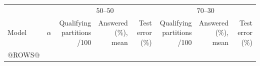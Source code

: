 \begin{tabular}{llrrrrrr}
\toprule
 & & \multicolumn{3}{c}{$50$--$50$} & \multicolumn{3}{c}{$70$--$30$}\\
\cmidrule(lr){3-5}\cmidrule(lr){6-8}
Model & $\alpha$ & \shortstack{Qualifying\\partitions /100} & \shortstack{Answered\\(\%), mean} & Test error (\%) & \shortstack{Qualifying\\partitions /100} & \shortstack{Answered\\(\%), mean} & Test error (\%)\\
\midrule
@ROWS@
\bottomrule
\end{tabular}

